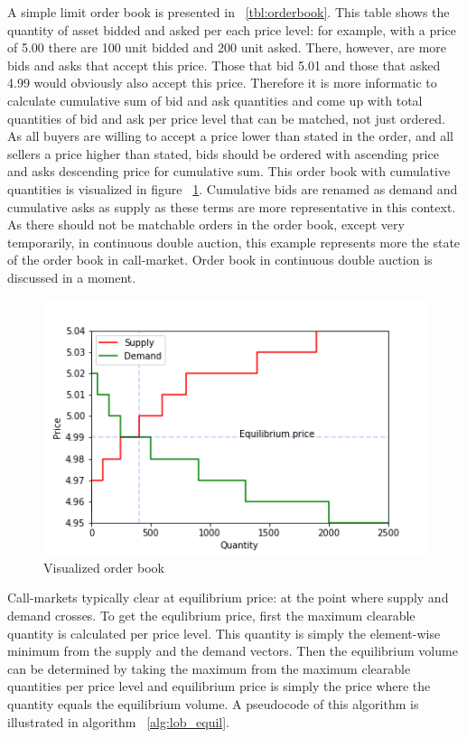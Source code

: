 A simple limit order book is presented in ~\ref{tbl:orderbook}. This table shows the
quantity of asset bidded and asked per each price level: for example, with a price of 5.00
there are 100 unit bidded and 200 unit asked. There, however, are more bids and asks that 
accept this price. Those that bid 5.01 and those that asked 4.99 would obviously also accept
this price. Therefore it is more informatic to calculate cumulative sum of bid and ask quantities
and come up with total quantities of bid and ask per price level that can be matched, not just ordered.
As all buyers are willing to accept a price lower than stated in the order, and all sellers a price higher
than stated, bids should be ordered with ascending price and asks descending price for cumulative sum.  
This order book with cumulative quantities is visualized in figure ~\ref{fig:lob_visual}. Cumulative bids
are renamed as demand and cumulative asks as supply as these terms are more representative in this context.
As there should not be matchable orders in the order book, except very temporarily, in continuous 
double auction, this example represents more the state of the order book in call-market. Order book
in continuous double auction is discussed in a moment.

\begin{figure}
    \begin{center}  
        \includegraphics{plots/orderbook_visualized.png}
        \caption{Visualized order book}
        \label{fig:lob_visual}
    \end{center}
\end{figure}

Call-markets typically clear at equilibrium price: at the point where
supply and demand crosses. 
To get the equlibrium price, first the maximum clearable quantity
is calculated per price level. This quantity is simply the element-wise
minimum from the supply and the demand vectors. Then the equilibrium volume
can be determined by taking the maximum from the maximum clearable quantities
per price level and equilibrium price is simply the price where the quantity
equals the equilibrium volume. A pseudocode of this algorithm is illustrated in 
algorithm ~\ref{alg:lob_equil}.

